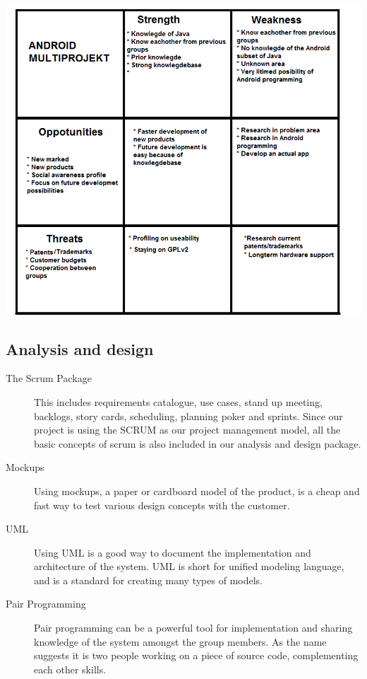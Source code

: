 \includegraphics[scale=0.60]{SWOT.png}

\subsection*{Analysis and design}
\begin{description}
 \item[The Scrum Package] This includes requirements catalogue, use cases, stand up meeting, backlogs, story cards, scheduling, planning poker and sprints.
       Since our project is using the SCRUM as our project management model, all the basic concepts of scrum is also included in our analysis and design package.
 \item[Mockups] Using mockups, a paper or cardboard model of the product, is a cheap and fast way to test various design concepts with the customer.
 \item[UML] Using UML is a good way to document the implementation and architecture of the system. UML is short for unified modeling language, and is a standard for creating many types of models.
 \item[Pair Programming] Pair programming can be a powerful tool for implementation and sharing knowledge of the system amongst the group members. As the name suggests it is two people working on a piece of source code, complementing each other skills.
\end{description}

